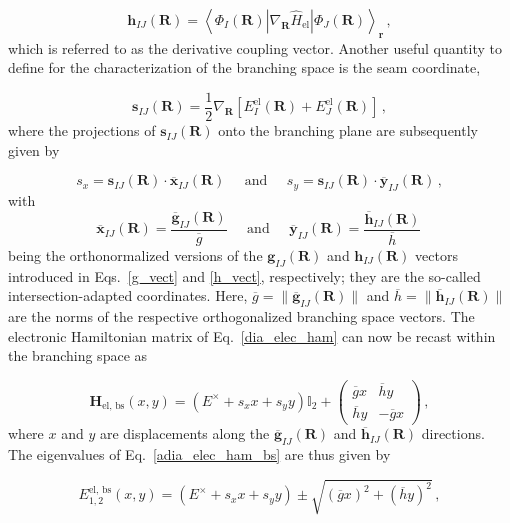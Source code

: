 \documentclass[9pt,bestpractices,pubversion]{livecoms}
\newcommand{\R}{\mathbf{R}}
\newcommand{\re}{\mathbf{r}}
\newcommand{\g}[2]{\mathbf{g}_{#1#2}(\R)}
\newcommand{\gua}[2]{\overline{\mathbf{g}}_{#1#2}(\R)}
\newcommand{\h}[2]{\mathbf{h}_{#1#2}(\R)}
\newcommand{\hua}[2]{\overline{\mathbf{h}}_{#1#2}(\R)}
\newcommand{\s}[2]{\mathbf{s}_{#1#2}(\R)}
\newcommand{\xua}[2]{\overline{\mathbf{x}}_{#1#2}(\R)}
\newcommand{\yua}[2]{\overline{\mathbf{y}}_{#1#2}(\R)}
\begin{document}
\begin{equation}
\label{h_vect}
    \h{I}{J} = \left< \Phi_I(\R) | \nabla_{\R}\hat{H}_{\text{el}} | \Phi_J(\R) \right>_{\re} \, ,
\end{equation}
which is referred to as the derivative coupling vector.
Another useful quantity to define for the characterization of the branching space is the seam coordinate,\cite{zhang_nonadiabatic_2021} 

\begin{equation}
\label{s_vect}
    \s{I}{J} = \frac{1}{2} \nabla_{\R} \left[E_I^{\text{el}}(\R) + E_J^{\text{el}}(\R)\right] \, ,
\end{equation}
where the projections of $\s{I}{J}$ onto the branching plane are subsequently given by

\begin{equation}
\label{sx_and_sy}
    s_x = \s{I}{J} \cdot \xua{I}{J} \;\;\;\;\; \text{and} \;\;\;\;\; s_y = \s{I}{J} \cdot \yua{I}{J} \, ,
\end{equation}
with
\begin{equation}
\label{int_adapt_coords}
    \xua{I}{J} = \frac{\gua{I}{J}}{\overline{g}} \;\;\;\;\; \text{and} \;\;\;\;\; \yua{I}{J} = \frac{\hua{I}{J}}{\overline{h}} \, 
\end{equation}
being the orthonormalized versions of the $\g{I}{J}$ and $\h{I}{J}$ vectors introduced in Eqs.~\eqref{g_vect} and \eqref{h_vect}, respectively; they are the so-called intersection-adapted coordinates.
Here, $\overline{g} = \|\gua{I}{J}\|$ and $\overline{h} = \|\hua{I}{J}\|$ are the norms of the respective orthogonalized branching space vectors.
The electronic Hamiltonian matrix of Eq.~\eqref{dia_elec_ham} can now be recast within the branching space as 

\begin{equation}
\label{adia_elec_ham_bs}
    \mathbf{H}_{\text{el, bs}}(x, y) = \left(E^\times + s_x x + s_y y\right)\mathbb{I}_2 + 
    \begin{pmatrix}
        \overline{g}x & \overline{h}y \\
        \overline{h}y & -\overline{g}x
    \end{pmatrix} \, ,
\end{equation}
where $x$ and $y$ are displacements along the $\gua{I}{J}$ and $\hua{I}{J}$ directions.\cite{matsika_nonadiabatic_2011}
The eigenvalues of Eq.~\eqref{adia_elec_ham_bs} are thus given by

\begin{equation}
\label{adia_elec_eigenval_bs}
    E_{1,2}^{\text{el, bs}}(x,y) = \left(E^\times + s_x x + s_y y\right) \pm \sqrt{\left(\overline{g}x\right)^2 + \left(\overline{h}y\right)^2} \, ,
\end{equation}
\end{document}

